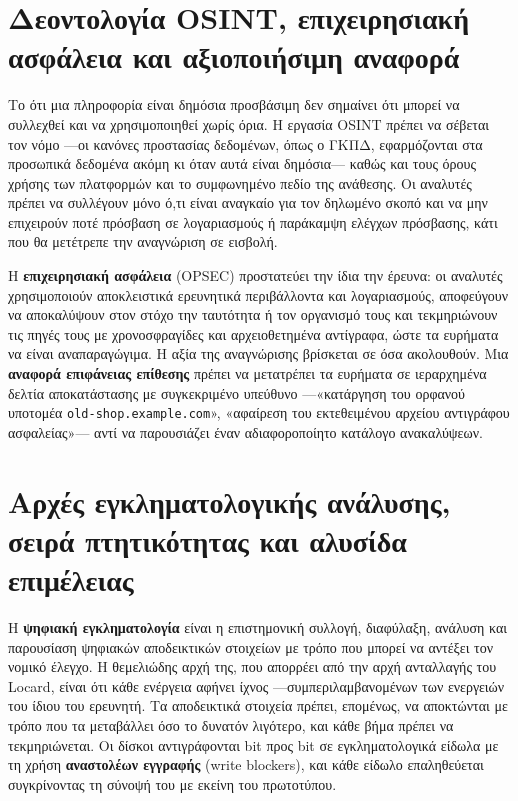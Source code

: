 \section{Δεοντολογία OSINT, επιχειρησιακή ασφάλεια και αξιοποιήσιμη αναφορά}\label{sec:12.4}
Το ότι μια πληροφορία είναι δημόσια προσβάσιμη δεν σημαίνει ότι μπορεί να συλλεχθεί και να χρησιμοποιηθεί χωρίς όρια. Η εργασία OSINT πρέπει να σέβεται τον νόμο —οι κανόνες προστασίας δεδομένων, όπως ο ΓΚΠΔ, εφαρμόζονται στα προσωπικά δεδομένα ακόμη κι όταν αυτά είναι δημόσια— καθώς και τους όρους χρήσης των πλατφορμών και το συμφωνημένο πεδίο της ανάθεσης. Οι αναλυτές πρέπει να συλλέγουν μόνο ό,τι είναι αναγκαίο για τον δηλωμένο σκοπό και να μην επιχειρούν ποτέ πρόσβαση σε λογαριασμούς ή παράκαμψη ελέγχων πρόσβασης, κάτι που θα μετέτρεπε την αναγνώριση σε εισβολή.

Η \textbf{επιχειρησιακή ασφάλεια} (OPSEC) προστατεύει την ίδια την έρευνα: οι αναλυτές χρησιμοποιούν αποκλειστικά ερευνητικά περιβάλλοντα και λογαριασμούς, αποφεύγουν να αποκαλύψουν στον στόχο την ταυτότητα ή τον οργανισμό τους και τεκμηριώνουν τις πηγές τους με χρονοσφραγίδες και αρχειοθετημένα αντίγραφα, ώστε τα ευρήματα να είναι αναπαραγώγιμα. Η αξία της αναγνώρισης βρίσκεται σε όσα ακολουθούν. Μια \textbf{αναφορά επιφάνειας επίθεσης} πρέπει να μετατρέπει τα ευρήματα σε ιεραρχημένα δελτία αποκατάστασης με συγκεκριμένο υπεύθυνο —«κατάργηση του ορφανού υποτομέα \texttt{old-shop.example.com}», «αφαίρεση του εκτεθειμένου αρχείου αντιγράφου ασφαλείας»— αντί να παρουσιάζει έναν αδιαφοροποίητο κατάλογο ανακαλύψεων.

\section{Αρχές εγκληματολογικής ανάλυσης, σειρά πτητικότητας και αλυσίδα επιμέλειας}\label{sec:12.5}
Η \textbf{ψηφιακή εγκληματολογία} είναι η επιστημονική συλλογή, διαφύλαξη, ανάλυση και παρουσίαση ψηφιακών αποδεικτικών στοιχείων με τρόπο που μπορεί να αντέξει τον νομικό έλεγχο. Η θεμελιώδης αρχή της, που απορρέει από την αρχή ανταλλαγής του Locard, είναι ότι κάθε ενέργεια αφήνει ίχνος —συμπεριλαμβανομένων των ενεργειών του ίδιου του ερευνητή. Τα αποδεικτικά στοιχεία πρέπει, επομένως, να αποκτώνται με τρόπο που τα μεταβάλλει όσο το δυνατόν λιγότερο, και κάθε βήμα πρέπει να τεκμηριώνεται. Οι δίσκοι αντιγράφονται bit προς bit σε εγκληματολογικά είδωλα με τη χρήση \textbf{αναστολέων εγγραφής} (write blockers), και κάθε είδωλο επαληθεύεται συγκρίνοντας τη σύνοψή του με εκείνη του πρωτοτύπου.

